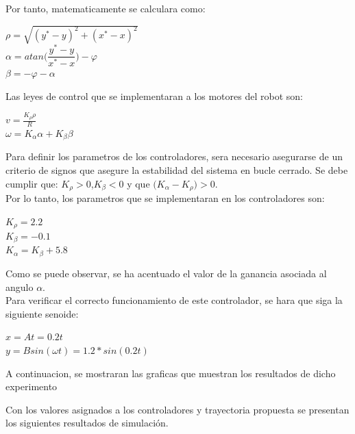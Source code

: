 \documentclass[a4paper,twoside]{article}
\begin{document}
Por tanto, matematicamente se calculara como:
\begin{center}
$\rho=\sqrt{(y^*-y)^2+(x^*-x)^2}$ \\
$\alpha=atan\Big(\dfrac{y^*-y}{x^*-x}\Big)-\varphi$ \\
$\beta=-\varphi-\alpha$
\end{center}

Las leyes de control que se implementaran a los motores del robot son:
\begin{center}
$v=\frac{K_{\rho}\rho}{R}$ \\
$\omega=K_{\alpha}\alpha + K_{\beta}\beta$
\end{center}

Para definir los parametros de los controladores, sera necesario asegurarse de un criterio de signos que asegure la estabilidad del sistema en bucle cerrado. Se debe cumplir que: $K_{\rho}>0$,$K_{\beta}<0$ y que $\Big(K_{\alpha}-K_{\rho}\Big)>0$.\\
Por lo tanto, los parametros que se implementaran en los controladores son:
\begin{center}
$K_{\rho}=2.2$\\
$K_{\beta}=-0.1$\\
$K_{\alpha}=K_{\beta}+5.8$
\end{center}
Como se puede observar, se ha acentuado el valor de la ganancia asociada al angulo $\alpha$. \\

Para verificar el correcto funcionamiento de este controlador, se hara que siga la siguiente senoide:
\begin{center}
$x=At=0.2t$\\
$y=Bsin(\omega t)=1.2*sin(0.2t)$
\end{center}

A continuacion, se mostraran las graficas que muestran los resultados de dicho experimento


Con los valores asignados a los controladores y trayectoria propuesta se presentan los siguientes
	resultados de simulación.\\ 
\end{document}
